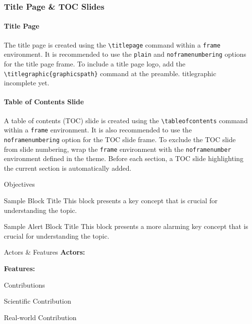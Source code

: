 \begin{frame}
  \frametitle{Title Page \& TOC Slides}

  \paragraph{Title Page}
  The title page is created using the \Verb|\titlepage| command within a \Verb|frame| environment.
  It is recommended to use the \Verb|plain| and \Verb|noframenumbering| options for the title page frame.
  To include a title page logo, add the \Verb|\titlegraphic{graphicspath}| command at the preamble.
  \alert{titlegraphic incomplete yet.}

  \paragraph{Table of Contents Slide}
  A table of contents (TOC) slide is created using the \Verb|\tableofcontents| command within a \Verb|frame| environment.
  It is also recommended to use the \Verb|noframenumbering| option for the TOC slide frame.
  To exclude the TOC slide from slide numbering, wrap the \Verb|frame| environment with the \Verb|noframenumber| environment defined in the theme.
  Before each section, a TOC slide highlighting the current section is automatically added.

\end{frame}

\begin{frame}[label=objectives]{Objectives 
  \hyperlink{scope}{}
}
	\begin{block}{Sample Block Title}
		This block presents a \alert{key concept} that is crucial for understanding the topic.
	\end{block}
	\begin{alertblock}{Sample Alert Block Title}
		This block presents a more alarming \alert{key concept} that is crucial for understanding the topic.
	\end{alertblock}
	\note{}
\end{frame}

\begin{frame}{Actors \& Features}
	\textbf{Actors:}
									
	\textbf{Features:}
	\note{}
\end{frame}


\begin{frame}{Contributions}				
	\begin{block}{Scientific Contribution}
	\end{block}						
	\begin{block}{Real-world Contribution}
	\end{block}					
	\note{}
\end{frame}
